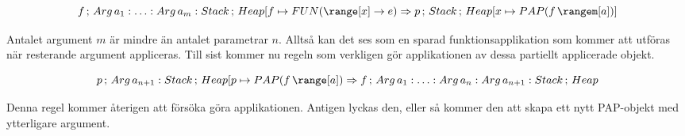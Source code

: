 \documentclass[../Core]{subfiles}
\begin{document}
\[
f\,;\, Arg\, a_{1}:\ldots:Arg\, a_{m}:Stack\,;\, Heap[f\mapsto\FUN{\range[x]}e\Rightarrow p\,;\, Stack\,;\, Heap[x\mapsto\PAP f{\rangem[a]}]\]


Antalet argument $m$ är mindre än antalet parametrar $n$.
Alltså kan det ses som en sparad funktionsapplikation som kommer att
utföras när resterande argument appliceras. Till sist kommer nu
regeln som verkligen gör applikationen av dessa partiellt applicerade
objekt.

\[
p\,;\, Arg\, a_{n+1}:Stack\,;\, Heap[p\mapsto\PAP f{\range[a]}\Rightarrow f\,;\, Arg\, a_{1}:\ldots:Arg\, a_{n}:Arg\, a_{n+1}:Stack\,;\, Heap\]


Denna regel kommer återigen att försöka göra applikationen. Antigen lyckas
den, eller så kommer den att skapa ett nytt PAP-objekt med ytterligare
argument.
\end{document}

